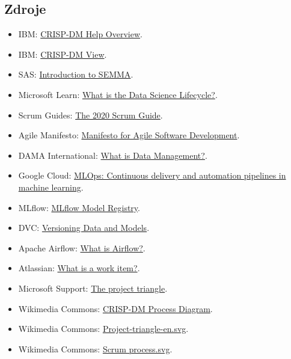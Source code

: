 \subsection{Zdroje}
\begin{itemize}
  \item IBM:
    \href{https://www.ibm.com/docs/en/spss-modeler/SaaS?topic=dm-crisp-help-overview}{CRISP-DM Help Overview}.
  \item IBM:
    \href{https://www.ibm.com/docs/en/spss-modeler/18.6.0?topic=projects-crisp-dm-view}{CRISP-DM View}.
  \item SAS:
    \href{https://documentation.sas.com/doc/en/emref/15.3/n061bzurmej4j3n1jnj8bbjjm1a2.htm}{Introduction to SEMMA}.
  \item Microsoft Learn:
    \href{https://learn.microsoft.com/en-us/shows/dev-intro-to-data-science/what-is-the-data-science-lifecycle-2-of-28}{What is the Data Science Lifecycle?}.
  \item Scrum Guides:
    \href{https://scrumguides.org/scrum-guide.html}{The 2020 Scrum Guide}.
  \item Agile Manifesto:
    \href{https://agilemanifesto.org/}{Manifesto for Agile Software Development}.
  \item DAMA International:
    \href{https://dama.org/about-dama/what-is-data-management/}{What is Data Management?}.
  \item Google Cloud:
    \href{https://docs.cloud.google.com/architecture/mlops-continuous-delivery-and-automation-pipelines-in-machine-learning}{MLOps: Continuous delivery and automation pipelines in machine learning}.
  \item MLflow:
    \href{https://www.mlflow.org/docs/2.2.1/model-registry.html}{MLflow Model Registry}.
  \item DVC:
    \href{https://dvc.org/doc/use-cases/versioning-data-and-models}{Versioning Data and Models}.
  \item Apache Airflow:
    \href{https://airflow.apache.org/docs/apache-airflow/2.11.0/}{What is Airflow?}.
  \item Atlassian:
    \href{https://support.atlassian.com/jira-software-cloud/docs/what-is-an-issue/}{What is a work item?}.
  \item Microsoft Support:
    \href{https://support.microsoft.com/en-us/office/the-project-triangle-8c892e06-d761-4d40-8e1f-17b33fdcf810}{The project triangle}.
  \item Wikimedia Commons:
    \href{https://commons.wikimedia.org/wiki/File:CRISP-DM\_Process\_Diagram.png}{CRISP-DM Process Diagram}.
  \item Wikimedia Commons:
    \href{https://commons.wikimedia.org/wiki/File:Project-triangle-en.svg}{Project-triangle-en.svg}.
  \item Wikimedia Commons:
    \href{https://commons.wikimedia.org/wiki/File:Scrum_process.svg}{Scrum process.svg}.
\end{itemize}

\newpage
